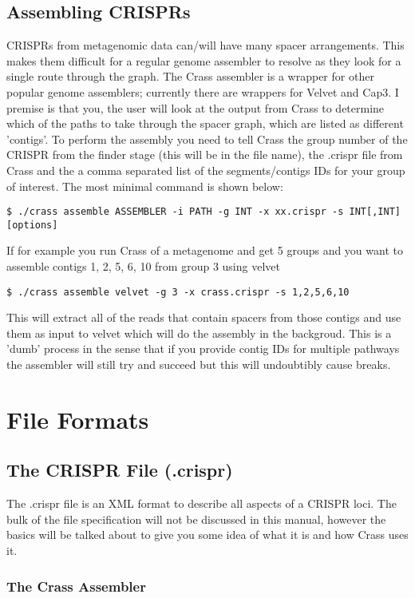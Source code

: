 \documentclass[11pt]{article} %
\begin{document}
\subsection{Assembling CRISPRs}
CRISPRs from metagenomic data can/will have many spacer arrangements.  This makes them difficult for a regular genome assembler to resolve as they look for a single route through the graph.   The Crass assembler is a wrapper for other popular genome assemblers; currently there are wrappers for Velvet and Cap3.  I premise is that you, the user will look at the output from Crass to determine which of the paths to take through the spacer graph, which are listed as different 'contigs'. To perform the assembly you need to tell Crass the group number of the CRISPR from the finder stage (this will be in the file name), the .crispr file from Crass and the a comma separated list of the segments/contigs IDs for your group of interest.  The most minimal command is shown below: 
 \begin{lstlisting}[basicstyle=\footnotesize]
$ ./crass assemble ASSEMBLER -i PATH -g INT -x xx.crispr -s INT[,INT] [options]
\end{lstlisting}
 If for example you run Crass of a metagenome and get 5 groups and you want to assemble contigs 1, 2, 5, 6, 10 from group 3 using velvet
 \begin{lstlisting}[basicstyle=\footnotesize]
$ ./crass assemble velvet -g 3 -x crass.crispr -s 1,2,5,6,10
\end{lstlisting}

This will extract all of the reads that contain spacers from those contigs and use them as input to velvet which will do the assembly in the backgroud.  This is a 'dumb' process in the sense that if you provide contig IDs for multiple pathways the assembler will still try and succeed but this will undoubtibly cause breaks. 

\section{File Formats}
\label{sec:Fileformats}
\subsection{The CRISPR File (.crispr)}
The .crispr file is an XML format to describe all aspects of a CRISPR loci.  The bulk of the file specification will not be discussed in this manual, however the basics will be talked about to give you some idea of what it is and how Crass uses it.
\subsubsection{The Crass Assembler}
\end{document}
